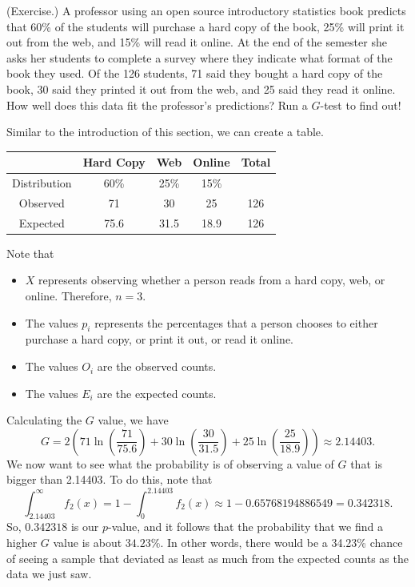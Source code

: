 \documentclass[letterpaper]{article}
\newcommand{\0}{\mathbf{0}}
\begin{document}
\begin{mdframed}
    (Exercise.) A professor using an open source introductory statistics book predicts that 60\% of the students will purchase a hard copy of the book, 25\% will print it out from the web, and 15\% will read it online. At the end of the semester she asks her students to complete a survey where they indicate what format of the book they used. Of the 126 students, 71 said they bought a hard copy of the book, 30 said they printed it out from the web, and 25 said they read it online. How well does this data fit the professor's predictions? Run a $G$-test to find out!

    \begin{mdframed}
        Similar to the introduction of this section, we can create a table. 
        \begin{center}
            \begin{tabular}{c|c c c c}
                    & Hard Copy & Web & Online & Total \\
                \hline  
                Distribution & 60\% & 25\% & 15\% \\ 
                Observed & 71 & 30 & 25 & 126 \\ 
                Expected & 75.6 & 31.5 & 18.9 & 126
            \end{tabular}
        \end{center}
        Note that 
        \begin{itemize}
            \item $X$ represents observing whether a person reads from a hard copy, web, or online. Therefore, $n = 3$.
            \item The values $p_i$ represents the percentages that a person chooses to either purchase a hard copy, or print it out, or read it online.
            \item The values $O_i$ are the observed counts. 
            \item The values $E_i$ are the expected counts. 
        \end{itemize}
        
        Calculating the $G$ value, we have 
        \[G = 2\left(71\ln\left(\frac{71}{75.6}\right) + 30\ln\left(\frac{30}{31.5}\right) + 25\ln\left(\frac{25}{18.9}\right)\right) \approx 2.14403.\]
        We now want to see what the probability is of observing a value of $G$ that is bigger than 2.14403. To do this, note that 
        \[\int_{2.14403}^{\infty} f_{2}(x) = 1 - \int_{0}^{2.14403} f_{2}(x) \approx 1 - 0.65768194886549 = 0.342318.\]
        So, $0.342318$ is our $p$-value, and it follows that the probability that we find a higher $G$ value is about $34.23\%$. In other words, there would be a 34.23\% chance of seeing a sample that deviated as least as much from the expected counts as the data we just saw. 
    \end{mdframed}
\end{mdframed}
\end{document}
